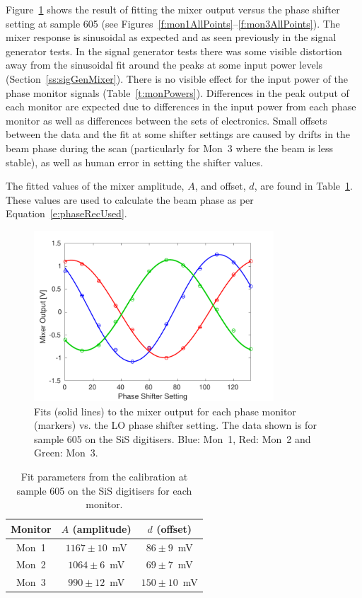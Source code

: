Figure~\ref{f:calSiS} shows the result of fitting the mixer output versus the phase shifter setting at sample 605 (see Figures~\ref{f:mon1AllPoints}--\ref{f:mon3AllPoints}). The mixer response is sinusoidal as expected and as seen previously in the signal generator tests. In the signal generator tests there was some visible distortion away from the sinusoidal fit around the peaks at some input power levels (Section~\ref{ss:sigGenMixer}). There is no visible effect for the input power of the phase monitor signals (Table~\ref{t:monPowers}). Differences in the peak output of each monitor are expected due to differences in the input power from each phase monitor as well as differences between the sets of electronics. Small offsets between the data and the fit at some shifter settings are caused by drifts in the beam phase during the scan (particularly for Mon~3 where the beam is less stable), as well as human error in setting the shifter values.

The fitted values of the mixer amplitude, \(A\), and offset, \(d\), are found in Table~\ref{t:calSiSConsts}. These values are used to calculate the beam phase as per Equation~\ref{e:phaseRecUsed}. 

\begin{figure}
  \centering
  \includegraphics[width=0.8\textwidth]{Figures/phaseMons/calSiS}
  \caption{Fits (solid lines) to the mixer output for each phase monitor (markers) vs. the LO phase shifter setting. The data shown is for sample 605 on the SiS digitisers. Blue: Mon~1, Red: Mon~2 and Green: Mon~3.}
  \label{f:calSiS}
\end{figure}

\begin{table}
  \begin{center}
    \begin{tabular}{|c c c|}
	   \hline
       Monitor & \(A\) (amplitude) & \(d\) (offset) \\ \hline
       Mon~1 & \(1167\pm10\)~mV & \(86\pm9\)~mV \\ 
       Mon~2 & \(1064\pm6\)~mV & \(69\pm7\)~mV\\
       Mon~3 & \(990\pm12\)~mV & \(150\pm10\)~mV\\ \hline
    \end{tabular}
    \caption{Fit parameters from the calibration at sample 605 on the SiS digitisers for each monitor.}
  	\label{t:calSiSConsts}
  \end{center}
\end{table}

